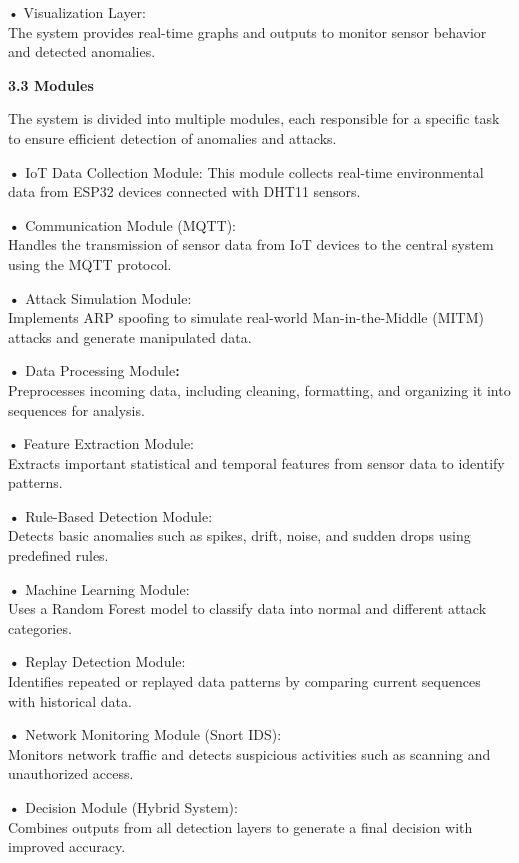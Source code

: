 • Visualization Layer:\\
The system provides real-time graphs and outputs to monitor sensor
behavior and detected anomalies.

\textbf{3.3 Modules}

The system is divided into multiple modules, each responsible for a
specific task to ensure efficient detection of anomalies and attacks.

\textbf{•} IoT Data Collection Module:\textbf{\hfill\break
}This module collects real-time environmental data from ESP32 devices
connected with DHT11 sensors.

\textbf{•} Communication Module (MQTT):\\
Handles the transmission of sensor data from IoT devices to the central
system using the MQTT protocol.

\textbf{•} Attack Simulation Module:\\
Implements ARP spoofing to simulate real-world Man-in-the-Middle (MITM)
attacks and generate manipulated data.

\textbf{•} Data Processing Module\textbf{:}\\
Preprocesses incoming data, including cleaning, formatting, and
organizing it into sequences for analysis.

• Feature Extraction Module:\\
Extracts important statistical and temporal features from sensor data to
identify patterns.

\textbf{•} Rule-Based Detection Module:\\
Detects basic anomalies such as spikes, drift, noise, and sudden drops
using predefined rules.

\textbf{•} Machine Learning Module:\\
Uses a Random Forest model to classify data into normal and different
attack categories.

\textbf{•} Replay Detection Module:\\
Identifies repeated or replayed data patterns by comparing current
sequences with historical data.

\textbf{•} Network Monitoring Module (Snort IDS):\\
Monitors network traffic and detects suspicious activities such as
scanning and unauthorized access.

\textbf{•} Decision Module (Hybrid System):\\
Combines outputs from all detection layers to generate a final decision
with improved accuracy.

